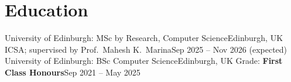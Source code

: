 \section{Education}
  \resumeSubHeadingListStart
    \resumeSubheading
      {University of Edinburgh: MSc by Research, Computer Science}{Edinburgh, UK}
      {ICSA; supervised by Prof.\ Mahesh K.\ Marina}{Sep 2025 -- Nov 2026 (expected)}
      \resumeItemListStart
      \resumeItemListEnd
    \resumeSubheading
      {University of Edinburgh: BSc Computer Science}{Edinburgh, UK}
      {Grade: \textbf{First Class Honours}}{Sep 2021 -- May 2025}
      \resumeItemListStart
      \resumeItemListEnd
  \resumeSubHeadingListEnd
